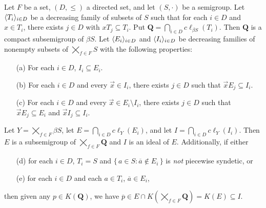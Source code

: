 \begin{lem}
  Let $F$ be a set, $(D, \le)$ a directed set, and let $(S, \cdot)$ be a semigroup.
  Let $\langle T_i \rangle_{i \in D}$ be a decreasing family of subsets of $S$ such that for each $i \in D$ and $x \in T_i$, there exists $j \in D$ with $xT_j \subseteq T_i$.
  Put $\mathbf{Q} = \bigcap_{i \in D} c\ell_{\beta S}(T_i)$.
  Then $\mathbf{Q}$ is a compact subsemigroup of $\beta S$.
  Let $\langle E_i \rangle_{i \in D}$ and $\langle I_i \rangle_{i \in D}$ be decreasing families of nonempty subsets of $\bigtimes_{f \in F} S$ with the following properties:
  \begin{itemize}
    \item[(a)]
      For each $i \in D$, $I_i \subseteq E_i$. 

    \item[(b)]
      For each $i \in D$ and every $\vec{x} \in I_i$, there exists $j \in D$ such that $\vec{x}E_j \subseteq I_i$.

    \item[(c)]
      For each $i \in D$ and every $\vec{x} \in E_i \setminus I_i$, there exists $j \in D$ such that $\vec{x} E_j \subseteq E_i$ and $\vec{x}I_j \subseteq I_i$.
  \end{itemize}

  Let $Y = \bigtimes_{f \in F} \beta S$, let $E = \bigcap_{i \in D} c\ell_{Y}(E_i)$, and let $I = \bigcap_{i \in D} c\ell_Y(I_i)$.
  Then $E$ is a subsemigroup of $\bigtimes_{f \in F} \mathbf{Q}$ and $I$ is an ideal of $E$. 
  Additionally, if either 
  \begin{itemize}
    \item[(d)]
      for each $i \in D$, $T_i = S$ and $\{\, a \in S : \overline{a} \not\in E_i \,\}$ is \emph{not} piecewise syndetic, or

    \item[(e)]
      for each $i \in D$ and each $a \in T_i$, $\overline{a} \in E_i$,
  \end{itemize}
then given any $p \in K(\mathbf{Q})$, we have $\overline{p} \in E \cap K(\bigtimes_{f \in F} \mathbf{Q}) = K(E) \subseteq I$. 
\end{lem}

